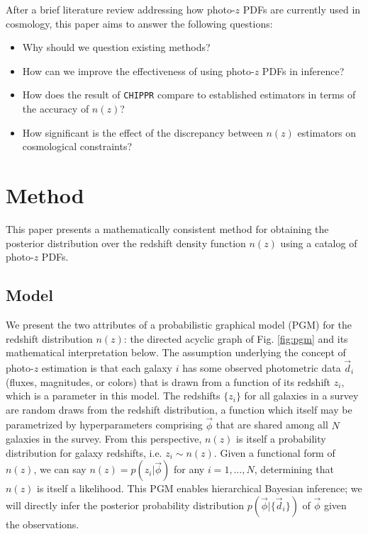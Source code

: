 \documentclass[iop]{emulateapj}
\newcommand{\chippr}{\texttt{CHIPPR} }
\begin{document}
After a brief literature review addressing how photo-$z$ PDFs are currently used in cosmology, this paper aims to answer the following questions:

\begin{itemize}
	\item Why should we question existing methods?
	\item How can we improve the effectiveness of using photo-$z$ PDFs in inference?
	\item How does the result of \chippr compare to established estimators in terms of the accuracy of $n(z)$?
	\item How significant is the effect of the discrepancy between $n(z)$ estimators on cosmological constraints?
\end{itemize}

\section{Method}
\label{sec:method}

This paper presents a mathematically consistent method for obtaining the posterior distribution over the redshift density function $n(z)$ using a catalog of photo-$z$ PDFs.

\subsection{Model}
\label{sec:model}

We present the two attributes of a probabilistic graphical model (PGM) for the redshift distribution $n(z)$: the directed acyclic graph of Fig. \ref{fig:pgm} and its mathematical interpretation below.  The assumption underlying the concept of photo-$z$ estimation is that each galaxy $i$ has some observed photometric data $\vec{d}_{i}$ (fluxes, magnitudes, or colors) that is drawn from a function of its redshift $z_{i}$, which is a parameter in this model.  The redshifts $\{z_{i}\}$ for all galaxies in a survey are random draws from the redshift distribution, a function which itself may be parametrized by hyperparameters comprising $\vec{\phi}$ that are shared among all $N$ galaxies in the survey.  From this perspective, $n(z)$ is itself a probability distribution for galaxy redshifts, i.e. $z_{i} \sim n(z)$.  Given a functional form of $n(z)$, we can say $n(z) = p(z_{i}|\vec{\phi})$ for any $i = 1, \dots, N$, determining that $n(z)$ is itself a likelihood.  This PGM enables hierarchical Bayesian inference; we will directly infer the posterior probability distribution $p(\vec{\phi} | \{\vec{d}_{i}\})$ of $\vec{\phi}$ given the observations.   
\end{document}

